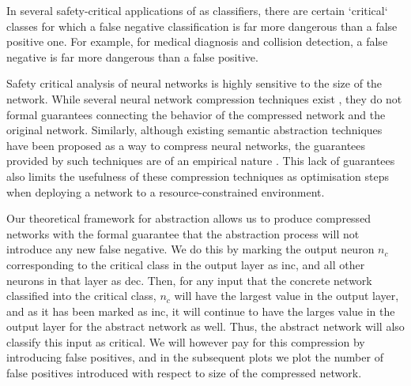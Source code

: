In several safety-critical applications of \dnn as classifiers, there are
certain `critical` classes for which a false negative classification is far more
dangerous than a false positive one. For example, for medical diagnosis and
collision detection, a false negative is far more dangerous than a false
positive.

Safety critical analysis of neural networks is highly sensitive to the size of
the network. While several neural network compression techniques exist 
\cite{dnn-compression} , they do not formal guarantees 
connecting the behavior of the compressed network and the original network. Similarly,
although existing semantic abstraction techniques have been proposed as 
a way to compress neural networks, the guarantees provided by such 
techniques are of an empirical nature \cite{lin-comb-abs-jan}.
This lack of guarantees also limits the usefulness of these compression
techniques as optimisation steps when deploying a network to a
resource-constrained environment. 

Our theoretical framework for abstraction allows us to produce compressed
networks with the formal guarantee that the abstraction process will not
introduce any new false negative. We do this by marking the output neuron $n_c$
corresponding to the critical class in the output layer as inc, and all other
neurons in that layer as dec.  Then, for any input that the concrete network
classified into the critical class, $n_c$ will have the largest value in the
output layer, and as it has been marked as inc, it will continue to have the
larges value in the output layer for the abstract network as well. Thus, the
abstract network will also classify this input as critical. We will however pay
for this compression by introducing false positives, and in the subsequent plots
we plot the number of false positives introduced with respect to size of the
compressed network.

